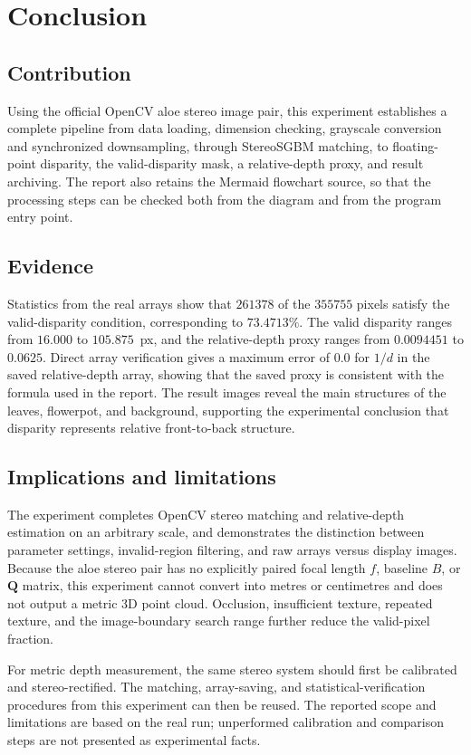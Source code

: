 \section{Conclusion}

\subsection{Contribution}

Using the official OpenCV aloe stereo image pair, this experiment establishes a complete pipeline from data loading, dimension checking, grayscale conversion and synchronized downsampling, through StereoSGBM matching, to floating-point disparity, the valid-disparity mask, a relative-depth proxy, and result archiving. The report also retains the Mermaid flowchart source, so that the processing steps can be checked both from the diagram and from the program entry point.

\subsection{Evidence}

Statistics from the real arrays show that $261378$ of the $355755$ pixels satisfy the valid-disparity condition, corresponding to $73.4713\%$. The valid disparity ranges from $16.000$ to $105.875$~px, and the relative-depth proxy ranges from $0.0094451$ to $0.0625$. Direct array verification gives a maximum error of $0.0$ for $1/d$ in the saved relative-depth array, showing that the saved proxy is consistent with the formula used in the report. The result images reveal the main structures of the leaves, flowerpot, and background, supporting the experimental conclusion that disparity represents relative front-to-back structure.

\subsection{Implications and limitations}

The experiment completes OpenCV stereo matching and relative-depth estimation on an arbitrary scale, and demonstrates the distinction between parameter settings, invalid-region filtering, and raw arrays versus display images. Because the aloe stereo pair has no explicitly paired focal length $f$, baseline $B$, or $\mathbf{Q}$ matrix, this experiment cannot convert  into metres or centimetres and does not output a metric 3D point cloud. Occlusion, insufficient texture, repeated texture, and the image-boundary search range further reduce the valid-pixel fraction.

For metric depth measurement, the same stereo system should first be calibrated and stereo-rectified. The matching, array-saving, and statistical-verification procedures from this experiment can then be reused. The reported scope and limitations are based on the real run; unperformed calibration and comparison steps are not presented as experimental facts.
